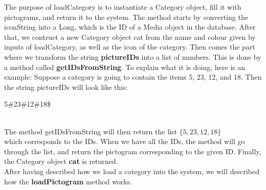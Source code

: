 The purpose of loadCategory is to instantiate a Category object, fill it with pictograms, and return it to the system.
The method starts by converting the iconString into a Long, which is the ID of a Media object in the database.
After that, we contruct a new Category object cat from the name and colour given by inputs of loadCategory, as well as the icon of the category.
Then comes the part where we transform the string \textbf{pictureIDs} into a list of numbers.
This is done by a method called \textbf{getIDsFromString}.
To explain what it is doing, here is an example:
Suppose a category is going to contain the items 5, 23, 12, and 18. Then the string pictureIDs will look like this:\newline

5\#23\#12\#18\$
 
\\
The method getIDsFromString will then return the list\newline
 \begin{math}
	\{5,23,12,18\}
\end{math}
\\
which corresponds to the IDs.
When we have all the IDs, the method will go through the list, and return the pictogram corresponding to the given ID.
Finally, the Category object \textbf{cat} is returned.\newline
\\
After having described how we load a category into the system, we will described how the \textbf{loadPictogram} method works.

